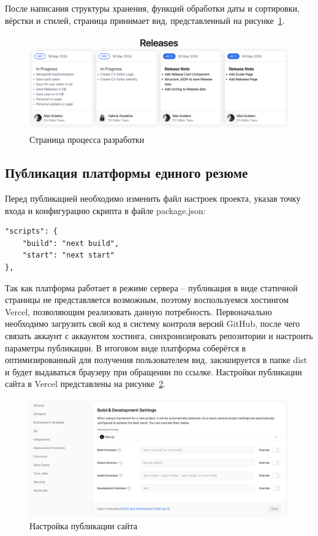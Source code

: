 \documentclass[master, och, diploma]{SCWorks}
\begin{document}
После написания структуры хранения, функций обработки даты и сортировки, вёрстки и стилей, страница принимает вид, представленный на рисунке~\ref{fig:30}.
\begin{figure}[!ht]
    \centering
    \includegraphics[width=12cm]{images/image-releases.png}
    \caption{\label{fig:30}%
        Страница процесса разработки}
\end{figure} 



\subsection{Публикация платформы единого резюме}
Перед публикацией необходимо изменить файл настроек проекта, указав точку входа и конфигурацию скрипта в файле package.json:
\begin{verbatim}
"scripts": {
    "build": "next build",
    "start": "next start"
},
\end{verbatim}

Так как платформа работает в режиме сервера – публикация в виде статичной страницы не представляется возможным, поэтому воспользуемся хостингом Vercel, позволяющим реализовать данную потребность. Первоначально необходимо загрузить свой код в систему контроля версий GitHub, после чего связать аккаунт с аккаунтом хостинга, синхронизировать репозитории и настроить параметры публикации. В итоговом виде платформа соберётся в оптимизированный для получения пользователем вид, закэшируется в папке dist и будет выдаваться браузеру при обращении по ссылке. Настройки публикации сайта в Vercel представлены на рисунке~\ref{fig:31}.
\begin{figure}[!ht]
    \centering
    \includegraphics[width=12cm]{images/image-vercel.png}
    \caption{\label{fig:31}%
        Настройка публикации сайта}
\end{figure} 
\end{document}
